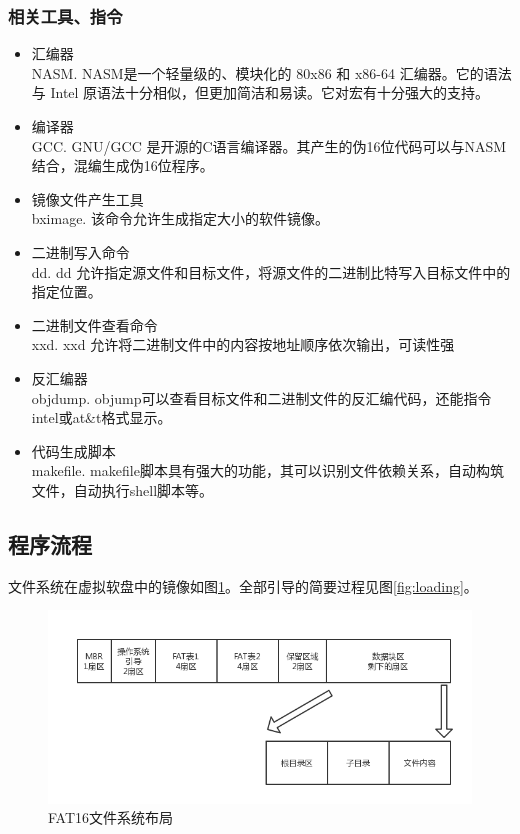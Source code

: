 \documentclass[a4paper]{article}
\begin{document}
    \subsubsection{相关工具、指令}
        \begin{itemize}
            \item 汇编器\\ 
            NASM. NASM是一个轻量级的、模块化的 80x86 和 x86-64 汇编器。它的语法与
            Intel 原语法十分相似，但更加简洁和易读。它对宏有十分强大的支持。
            \item 编译器\\
            GCC. GNU/GCC 是开源的C语言编译器。其产生的伪16位代码可以与NASM结合，混编生成伪16位程序。
            \item 镜像文件产生工具\\ 
            bximage. 该命令允许生成指定大小的软件镜像。
            \item 二进制写入命令\\ 
            dd. dd 允许指定源文件和目标文件，将源文件的二进制比特写入目标文件中的指定位置。
            \item 二进制文件查看命令\\ 
            xxd. xxd 允许将二进制文件中的内容按地址顺序依次输出，可读性强
            \item 反汇编器\\
            objdump. objump可以查看目标文件和二进制文件的反汇编代码，还能指令intel或at\&t格式显示。
            \item 代码生成脚本\\
            makefile. makefile脚本具有强大的功能，其可以识别文件依赖关系，自动构筑文件，自动执行shell脚本等。
        \end{itemize}
    \subsection{程序流程}\label{subsec:programProcedure}
    文件系统在虚拟软盘中的镜像如图\ref{fig:FAT16layout}。全部引导的简要过程见图\ref{fig:loading}。
    
    \begin{figure}
        \begin{center}
        \includegraphics[scale=0.5]{asset/softImage.png}
        \caption{FAT16文件系统布局\label{fig:FAT16layout}} 
        \end{center} 
    \end{figure} 
    
\end{document}

